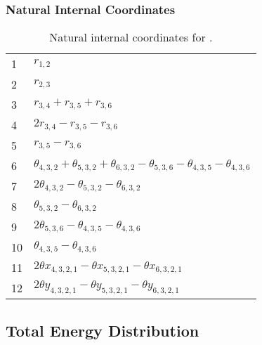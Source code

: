 \documentclass[10pt,oneside]{article}
\begin{document}
\begin{table}[h!]
\subsubsection*{Natural Internal Coordinates}
\centering
\caption{Natural internal coordinates for .}
\small
\begin{tabular}{ll}
\toprule
  1   & $r_{1,2}$ \\
  2   & $r_{2,3}$ \\
  3   & $r_{3,4} + r_{3,5} + r_{3,6}$ \\
  4   & $2r_{3,4} - r_{3,5} - r_{3,6}$ \\
  5   & $r_{3,5} - r_{3,6}$ \\
  6   & $\theta_{4,3,2} + \theta_{5,3,2} + \theta_{6,3,2} - \theta_{5,3,6} - \theta_{4,3,5} - \theta_{4,3,6}$ \\
  7   & $2\theta_{4,3,2} - \theta_{5,3,2} - \theta_{6,3,2}$ \\
  8   & $\theta_{5,3,2} - \theta_{6,3,2}$ \\
  9   & $2\theta_{5,3,6} - \theta_{4,3,5} - \theta_{4,3,6}$ \\
  10  & $\theta_{4,3,5} - \theta_{4,3,6}$ \\
  11  & $2\theta x_{4,3,2,1} - \theta x_{5,3,2,1} - \theta x_{6,3,2,1}$ \\
  12  & $2\theta y_{4,3,2,1} - \theta y_{5,3,2,1} - \theta y_{6,3,2,1}$ \\
\bottomrule
\end{tabular}
\end{table}

\begin{table}
\subsection*{Total Energy Distribution}
\centering\end{table}

\clearpage

\subsection{}
\end{document}
